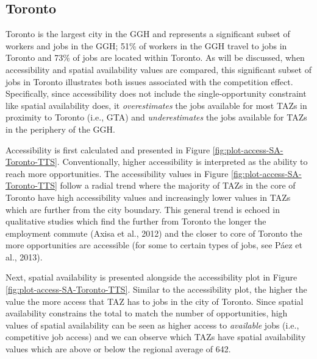 \documentclass[]{elsarticle} %
\begin{document}
\hypertarget{toronto}{%
\subsection{Toronto}\label{toronto}}

Toronto is the largest city in the GGH and represents a significant
subset of workers and jobs in the GGH; 51\% of workers in the GGH travel
to jobs in Toronto and 73\% of jobs are located within Toronto. As will
be discussed, when accessibility and spatial availability values are
compared, this significant subset of jobs in Toronto illustrates both
issues associated with the competition effect. Specifically, since
accessibility does not include the single-opportunity constraint like
spatial availability does, it \emph{overestimates} the jobs available
for most TAZs in proximity to Toronto (i.e., GTA) and
\emph{underestimates} the jobs available for TAZs in the periphery of
the GGH.

Accessibility is first calculated and presented in Figure
\ref{fig:plot-access-SA-Toronto-TTS}. Conventionally, higher
accessibility is interpreted as the ability to reach more opportunities.
The accessibility values in Figure \ref{fig:plot-access-SA-Toronto-TTS}
follow a radial trend where the majority of TAZs in the core of Toronto
have high accessibility values and increasingly lower values in TAZs
which are further from the city boundary. This general trend is echoed
in qualitative studies which find the further from Toronto the longer
the employment commute (Axisa et al., 2012) and the closer to core of
Toronto the more opportunities are accessible (for some to certain types
of jobs, see Páez et al., 2013).

Next, spatial availability is presented alongside the accessibility plot
in Figure \ref{fig:plot-access-SA-Toronto-TTS}. Similar to the
accessibility plot, the higher the value the more access that TAZ has to
jobs in the city of Toronto. Since spatial availability constrains the
total to match the number of opportunities, high values of spatial
availability can be seen as higher access to \emph{available} jobs
(i.e., competitive job access) and we can observe which TAZs have
spatial availability values which are above or below the regional
average of 642.
\end{document}
